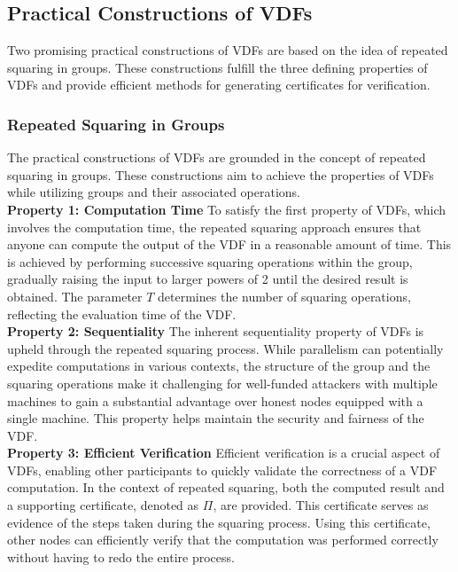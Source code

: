 \subsection{Practical Constructions of VDFs}
Two promising practical constructions of VDFs are based on the idea of repeated squaring in groups. These constructions fulfill the three defining properties of VDFs and provide efficient methods for generating certificates for verification.

\subsubsection{Repeated Squaring in Groups}
The practical constructions of VDFs are grounded in the concept of repeated squaring in groups. These constructions aim to achieve the properties of VDFs while utilizing groups and their associated operations.\\

\noindent
\textbf{Property 1: Computation Time}
To satisfy the first property of VDFs, which involves the computation time, the repeated squaring approach ensures that anyone can compute the output of the VDF in a reasonable amount of time. This is achieved by performing successive squaring operations within the group, gradually raising the input to larger powers of 2 until the desired result is obtained. The parameter $T$ determines the number of squaring operations, reflecting the evaluation time of the VDF.\\

\noindent
\textbf{Property 2: Sequentiality}
The inherent sequentiality property of VDFs is upheld through the repeated squaring process. While parallelism can potentially expedite computations in various contexts, the structure of the group and the squaring operations make it challenging for well-funded attackers with multiple machines to gain a substantial advantage over honest nodes equipped with a single machine. This property helps maintain the security and fairness of the VDF.\\

\noindent
\textbf{Property 3: Efficient Verification}
Efficient verification is a crucial aspect of VDFs, enabling other participants to quickly validate the correctness of a VDF computation. In the context of repeated squaring, both the computed result and a supporting certificate, denoted as $\Pi$, are provided. This certificate serves as evidence of the steps taken during the squaring process. Using this certificate, other nodes can efficiently verify that the computation was performed correctly without having to redo the entire process.

